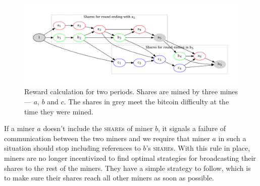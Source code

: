 \documentclass{article}
\begin{document}
\begin{figure}
  \begin{center}
    \includegraphics[width=1.0\textwidth]{reward-calculation}
    \caption{Reward calculation for two periods. Shares are mined by
      three mines --- $a$, $b$ and $c$. The shares in grey meet the
      bitcoin difficulty at the time they were
      mined.}\label{fig:reward-calculation}
  \end{center}
\end{figure}

If a miner $a$ doesn't include the \textsc{share}s of miner $b$, it
signals a failure of communication between the two miners and we
require that miner $a$ in such a situation should stop including
references to $b$'s \textsc{share}s. With this rule in place, miners
are no longer incentivized to find optimal strategies for broadcasting
their shares to the rest of the miners. They have a simple strategy to
follow, which is to make sure their shares reach all other miners as
soon as possible.


\end{document}
